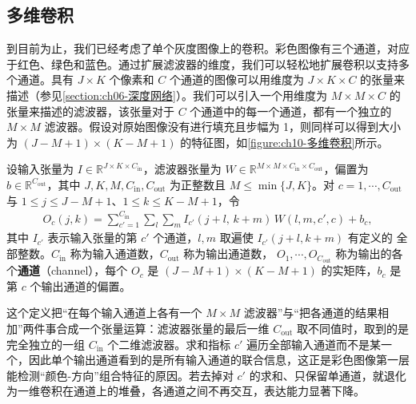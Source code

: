 \documentclass[../../main.tex]{subfiles}
\begin{document}
\subsection{多维卷积}\label{subsection:ch10-多维卷积}

到目前为止，我们已经考虑了单个灰度图像上的卷积。彩色图像有三个通道，对应于红色、绿色和蓝色。通过扩展滤波器的维度，我们可以轻松地扩展卷积以支持多个通道。具有 $J\times K$ 个像素和 $C$ 个通道的图像可以用维度为 $J\times K\times C$ 的张量来描述（参见\cref{section:ch06-深度网络}）。我们可以引入一个用维度为 $M\times M\times C$ 的张量来描述的滤波器，该张量对于 $C$ 个通道中的每一个通道，都有一个独立的 $M\times M$ 滤波器。假设对原始图像没有进行填充且步幅为 1，则同样可以得到大小为 $(J-M+1)\times (K-M+1)$ 的特征图，如\cref{figure:ch10-多维卷积}所示。

\begin{definition}[多通道卷积与通道数]\label{definition:ch10-多维卷积}
设输入张量为 $I\in\mathbb{R}^{J\times K\times C_{\mathrm{in}}}$，滤波器张量为
$W\in\mathbb{R}^{M\times M\times C_{\mathrm{in}}\times C_{\mathrm{out}}}$，偏置为
$b\in\mathbb{R}^{C_{\mathrm{out}}}$，其中 $J,K,M,C_{\mathrm{in}},C_{\mathrm{out}}$
为正整数且 $M\leqslant\min\{J,K\}$。对 $c=1,\cdots,C_{\mathrm{out}}$ 与
$1\leqslant j\leqslant J-M+1$、$1\leqslant k\leqslant K-M+1$，令
\begin{align}
  O_c(j,k)=\sum_{c'=1}^{C_{\mathrm{in}}}\sum_{l}\sum_{m} I_{c'}(j+l,\,k+m)\,W(l,m,c',c)+b_c,
  \label{align:ch10-多通道卷积}
\end{align}
其中 $I_{c'}$ 表示输入张量的第 $c'$ 个通道，$l,m$ 取遍使 $I_{c'}(j+l,k+m)$ 有定义的
全部整数。$C_{\mathrm{in}}$ 称为输入通道数，$C_{\mathrm{out}}$ 称为输出通道数，
$O_1,\cdots,O_{C_{\mathrm{out}}}$ 称为输出的各个\textbf{通道}（channel），每个 $O_c$ 是
$(J-M+1)\times(K-M+1)$ 的实矩阵，$b_c$ 是第 $c$ 个输出通道的偏置。
\end{definition}

\begin{remark}
这个定义把“在每个输入通道上各有一个 $M\times M$ 滤波器”与“把各通道的结果相加”两件事合成一个张量运算：滤波器张量的最后一维 $C_{\mathrm{out}}$ 取不同值时，取到的是完全独立的一组 $C_{\mathrm{in}}$ 个二维滤波器。求和指标 $c'$ 遍历全部输入通道而不是某一个，因此单个输出通道看到的是所有输入通道的联合信息，这正是彩色图像第一层能检测“颜色-方向”组合特征的原因。若去掉对 $c'$ 的求和、只保留单通道，就退化为一维卷积在通道上的堆叠，各通道之间不再交互，表达能力显著下降。
\end{remark}
\end{document}
